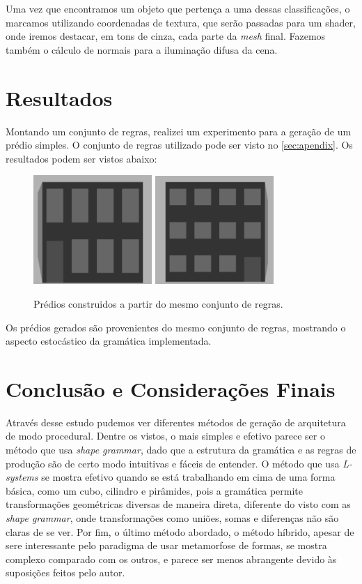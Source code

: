 \documentclass[a4paper, 11pt]{article}
\begin{document}
        Uma vez que encontramos um objeto que pertença a uma dessas classificações, o marcamos utilizando coordenadas de textura, que serão passadas para um shader, onde iremos destacar, em tons de cinza, cada parte da \textit{mesh} final. Fazemos também o cálculo de normais para a iluminação difusa da cena.

    \section{Resultados} \label{sec:res}
    Montando um conjunto de regras, realizei um experimento para a geração de um prédio simples. O conjunto de regras utilizado pode ser visto no \ref{sec:apendix}. Os resultados podem ser vistos abaixo:

    \begin{figure}[h]
        \centering
        \includegraphics[width=45mm]{imgs/building1.png} \includegraphics[width=45mm]{imgs/building2.png}
        \caption{Prédios construidos a partir do mesmo conjunto de regras.}
        \label{fig:testbuilding}
    \end{figure}

    Os prédios gerados são provenientes do mesmo conjunto de regras, mostrando o aspecto estocástico da gramática implementada.

    \section{Conclusão e Considerações Finais} \label{sec:con}
    Através desse estudo pudemos ver diferentes métodos de geração de arquitetura de modo procedural. Dentre os vistos, o mais simples e efetivo parece ser o método que usa \textit{shape grammar}, dado que a estrutura da gramática e as regras de produção são de certo modo intuitivas e fáceis de entender. O método que usa \textit{L-systems} se mostra efetivo quando se está trabalhando em cima de uma forma básica, como um cubo, cilindro e pirâmides, pois a gramática permite transformações geométricas diversas de maneira direta, diferente do visto com as \textit{shape grammar}, onde transformações como uniões, somas e diferenças não são claras de se ver. Por fim, o último método abordado, o método híbrido, apesar de sere interessante pelo paradigma de usar metamorfose de formas, se mostra complexo comparado com os outros, e parece ser menos abrangente devido às suposições feitos pelo autor.
\end{document}
